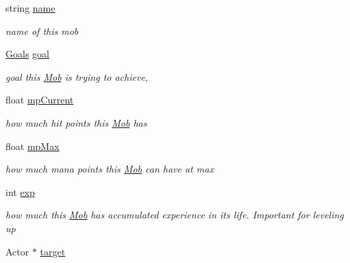 \begin{DoxyCompactItemize}
\item 
string \hyperlink{class_mob_a1adcb405b2a4647bfb2471b1283b9477}{name}\hypertarget{class_mob_a1adcb405b2a4647bfb2471b1283b9477}{}\label{class_mob_a1adcb405b2a4647bfb2471b1283b9477}

\begin{DoxyCompactList}\small\item\em name of this mob \end{DoxyCompactList}\item 
\hyperlink{class_mob_a886346a9f913203df0797f2c84dd8962}{Goals} \hyperlink{class_mob_ad6c2e1b70a39551fd39b25002dac55b1}{goal}
\begin{DoxyCompactList}\small\item\em goal this \hyperlink{class_mob}{Mob} is trying to achieve, \end{DoxyCompactList}\item 
float \hyperlink{class_mob_ae1388056fe541060e8c1607ae561801f}{mp\+Current}\hypertarget{class_mob_ae1388056fe541060e8c1607ae561801f}{}\label{class_mob_ae1388056fe541060e8c1607ae561801f}

\begin{DoxyCompactList}\small\item\em how much hit points this \hyperlink{class_mob}{Mob} has \end{DoxyCompactList}\item 
float \hyperlink{class_mob_a8156e952a713baa462990ce635bf9ae8}{mp\+Max}\hypertarget{class_mob_a8156e952a713baa462990ce635bf9ae8}{}\label{class_mob_a8156e952a713baa462990ce635bf9ae8}

\begin{DoxyCompactList}\small\item\em how much mana points this \hyperlink{class_mob}{Mob} can have at max \end{DoxyCompactList}\item 
int \hyperlink{class_mob_a30bc4209cc6c6294cd3c68943317e682}{exp}\hypertarget{class_mob_a30bc4209cc6c6294cd3c68943317e682}{}\label{class_mob_a30bc4209cc6c6294cd3c68943317e682}

\begin{DoxyCompactList}\small\item\em how much this \hyperlink{class_mob}{Mob} has accumulated experience in it\textquotesingle{}s life. Important for leveling up \end{DoxyCompactList}\item 
Actor $\ast$ \hyperlink{class_mob_a1bf86299dea0aa82c773a3b8d04d0593}{target}\hypertarget{class_mob_a1bf86299dea0aa82c773a3b8d04d0593}{}\label{class_mob_a1bf86299dea0aa82c773a3b8d04d0593}


\end{DoxyCompactItemize}
